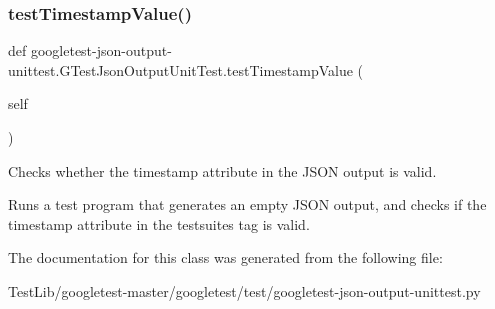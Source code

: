 \subsubsection{\texorpdfstring{test\+Timestamp\+Value()}{testTimestampValue()}}
{\footnotesize\ttfamily def googletest-\/json-\/output-\/unittest.\+G\+Test\+Json\+Output\+Unit\+Test.\+test\+Timestamp\+Value (\begin{DoxyParamCaption}\item[{}]{self }\end{DoxyParamCaption})}

\begin{DoxyVerb}Checks whether the timestamp attribute in the JSON output is valid.

Runs a test program that generates an empty JSON output, and checks if
the timestamp attribute in the testsuites tag is valid.
\end{DoxyVerb}
 

The documentation for this class was generated from the following file\+:\begin{DoxyCompactItemize}
\item 
Test\+Lib/googletest-\/master/googletest/test/googletest-\/json-\/output-\/unittest.\+py\end{DoxyCompactItemize}
